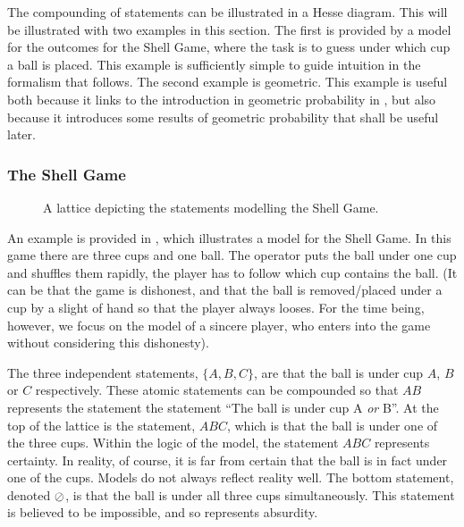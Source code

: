 {The compounding of statements can be illustrated in a Hesse diagram.  
This will be illustrated with two examples in this section.
The first is provided by a model for the outcomes for the Shell Game,
where the task is to guess under which cup a ball is placed.
This example is sufficiently simple to guide intuition in the formalism that follows.
The second example is geometric.
This example is useful both because it links to the introduction in geometric probability in ,
but also because it introduces some results of geometric probability that shall be useful later.

\subsubsection{The Shell Game}

\begin{figure}%
 \centering
{}
 \caption{
   A lattice depicting the statements modelling the Shell Game.
}
 \label{fig:ShellGame}
\end{figure}


An example is provided in , which illustrates a model for the Shell Game.
In this game there are three cups and one ball.
The operator puts the ball under one cup and shuffles them rapidly, 
the player has to follow which cup contains the ball.
(It can be that the game is dishonest, 
and that the ball is removed/placed under a cup by a slight of hand so that the player always looses.
For the time being, however, we focus on the model of a sincere player, 
who enters into the game without considering this dishonesty).

The three independent statements, $\{A,B,C\}$, are that the ball is under cup $A$, $B$ or $C$ respectively.
These atomic statements can be compounded so that $AB$ represents the statement the statement ``The ball is under cup A {\em or} B''.
At the top of the lattice is the statement, $ABC$, which is that the ball is under one of the three cups.
Within the logic of the model, the statement $ABC$ represents certainty.
In reality, of course, it is far from certain that the ball is in fact under one of the cups.
Models do not always reflect reality well.
The bottom statement, denoted $\oslash$, is that the ball is under all three cups simultaneously.
This statement is believed to be impossible, and so represents absurdity.

}
